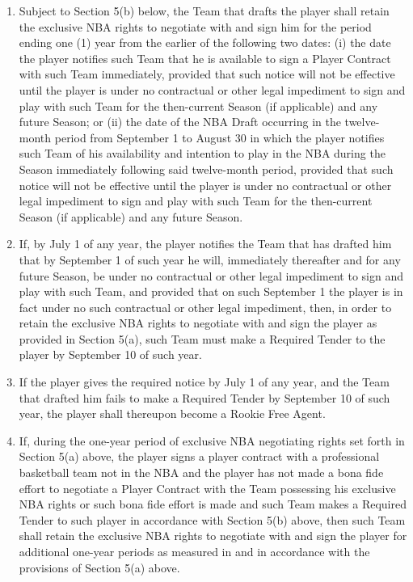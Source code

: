 \documentclass[
]{book}
\providecommand{\tightlist}{%
  \setlength{\itemsep}{0pt}\setlength{\parskip}{0pt}}
\begin{document}
\begin{enumerate}
\def\labelenumi{(\alph{enumi})}
\tightlist
\item
  Subject to Section 5(b) below, the Team that drafts the player shall retain the exclusive NBA rights to negotiate with and sign him for the period ending one (1) year from the earlier of the following two dates: (i) the date the player notifies such Team that he is available to sign a Player Contract with such Team immediately, provided that such notice will not be effective until the player is under no contractual or other legal impediment to sign and play with such Team for the then-current Season (if applicable) and any future Season; or (ii) the date of the NBA Draft occurring in the twelve-month period from September 1 to August 30 in which the player notifies such Team of his availability and intention to play in the NBA during the Season immediately following said twelve-month period, provided that such notice will not be effective until the player is under no contractual or other legal impediment to sign and play with such Team for the then-current Season (if applicable) and any future Season.
\item
  If, by July 1 of any year, the player notifies the Team that has drafted him that by September 1 of such year he will, immediately thereafter and for any future Season, be under no contractual or other legal impediment to sign and play with such Team, and provided that on such September 1 the player is in fact under no such contractual or other legal impediment, then, in order to retain the exclusive NBA rights to negotiate with and sign the player as provided in Section 5(a), such Team must make a Required Tender to the player by September 10 of such year.
\item
  If the player gives the required notice by July 1 of any year, and the Team that drafted him fails to make a Required Tender by September 10 of such year, the player shall thereupon become a Rookie Free Agent.
\item
  If, during the one-year period of exclusive NBA negotiating rights set forth in Section 5(a) above, the player signs a player contract with a professional basketball team not in the NBA and the player has not made a bona fide effort to negotiate a Player Contract with the Team possessing his exclusive NBA rights or such bona fide effort is made and such Team makes a Required Tender to such player in accordance with Section 5(b) above, then such Team shall retain the exclusive NBA rights to negotiate with and sign the player for additional one-year periods as measured in and in accordance with the provisions of Section 5(a) above.

\end{enumerate}
\end{document}
